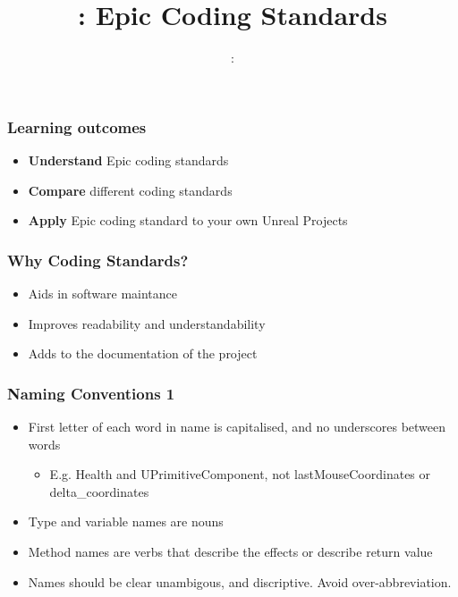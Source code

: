\usepackage{../../beamerthemeFalmouthGamesAcademy}
\usepackage{multimedia}
\graphicspath{ {../../} }


\usepackage[normalem]{ulem}
\usepackage{wasysym}
\usepackage{listings}
\usepackage{pdfpages}

\usetikzlibrary{arrows,automata}




\title{\sessionnumber: Epic Coding Standards}
\subtitle{\modulecode: \moduletitle}

\frame{\titlepage}

\begin{frame}
	\frametitle{Learning outcomes}
	\begin{itemize}
		\item \textbf{Understand} Epic coding standards
 		\item \textbf{Compare} different coding standards
 		\item \textbf{Apply} Epic coding standard to your own Unreal Projects
 	\end{itemize}
\end{frame}

\begin{frame}
  \frametitle{Why Coding Standards?}
   \begin{itemize}
    \item Aids in software maintance
    \item Improves readability and understandability
    \item Adds to the documentation of the project
  \end{itemize}
\end{frame}

\begin{frame}
  \frametitle{Naming Conventions 1}
  \begin{itemize}
    \item First letter of each word in name is capitalised, and no underscores between words
    \begin{itemize}
      \item E.g. Health and UPrimitiveComponent, not lastMouseCoordinates or delta\_coordinates
    \end{itemize}
    \item Type and variable names are nouns
    \item Method names are verbs that describe the effects or describe return value
    \item Names should be clear unambigous, and discriptive. Avoid over-abbreviation.
  \end{itemize}
\end{frame}

